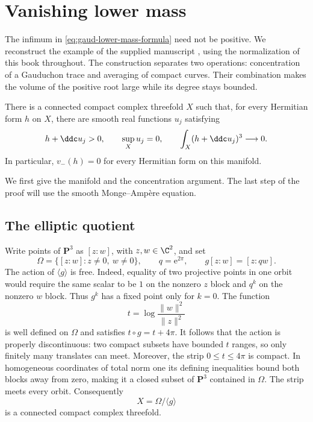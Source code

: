 \section{Vanishing lower mass}
\label{sec:vanishing-lower-mass}

The infimum in \eqref{eq:gaud-lower-mass-formula} need not be positive. We reconstruct the example of the supplied manuscript \cite{LowerMass26}, using the normalization of this book throughout. The construction separates two operations: concentration of a Gauduchon trace and averaging of compact curves. Their combination makes the volume of the positive root large while its degree stays bounded.

\begin{theorem}\label{thm:vanishing-lower-mass}
There is a connected compact complex threefold $X$ such that, for every Hermitian form $h$ on $X$, there are smooth real functions $u_j$ satisfying
\[
 h+\ddc u_j>0,\qquad \sup_Xu_j=0,\qquad
 \int_X(h+\ddc u_j)^3\longrightarrow0.
\]
In particular, $v_-(h)=0$ for every Hermitian form on this manifold.
\end{theorem}

We first give the manifold and the concentration argument. The last step of the proof will use the smooth Monge--Amp\`ere equation.

\subsection{The elliptic quotient}

Write points of $\mathbf P^3$ as $[z:w]$, with $z,w\in\C^2$, and set
\[
 \Omega=\{[z:w]:z\ne0,\ w\ne0\},\qquad
 q=\mathrm{e}^{2\pi},\qquad g[z:w]=[z:qw].
\]
The action of $\langle g\rangle$ is free. Indeed, equality of two projective points in one orbit would require the same scalar to be $1$ on the nonzero $z$ block and $q^k$ on the nonzero $w$ block. Thus $g^k$ has a fixed point only for $k=0$. The function
\[
 t=\log\frac{\|w\|^2}{\|z\|^2}
\]
is well defined on $\Omega$ and satisfies $t\circ g=t+4\pi$. It follows that the action is properly discontinuous: two compact subsets have bounded $t$ ranges, so only finitely many translates can meet. Moreover, the strip $0\leq t\leq4\pi$ is compact. In homogeneous coordinates of total norm one its defining inequalities bound both blocks away from zero, making it a closed subset of $\mathbf P^3$ contained in $\Omega$. The strip meets every orbit. Consequently
\[
 X=\Omega/\langle g\rangle
\]
is a connected compact complex threefold.

